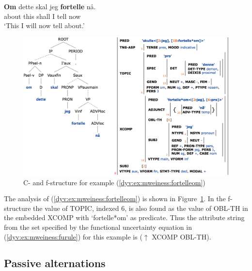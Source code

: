 \documentclass[output=paper]{langsci/langscibook}
\begin{document}
\ea\label{dyv:ex:mweiness:fortelleom}
\gll \textbf{Om} dette skal jeg \textbf{fortelle} nå.\\
     about this shall I tell now\\
\glt `This I will now tell about.'
\z

%

\begin{figure}
  \includegraphics[width=\textwidth]{figures/fortelle-om-c-f.png}
  \caption{C- and f-structure for example (\ref{dyv:ex:mweiness:fortelleom})}
  \label{dyv:fig:mweiness:fortelle-om-c-f}
\end{figure}

The analysis of  (\ref{dyv:ex:mweiness:fortelleom}) is shown in Figure~\ref{dyv:fig:mweiness:fortelle-om-c-f}.
In the f-structure the value of TOPIC, indexed 6, is also found as the value of OBL-TH in the embedded XCOMP with `fortelle*om' as predicate.
Thus the attribute string from the set specified by the functional uncertainty equation in (\ref{dyv:ex:mweiness:furule}) for this example is ($\uparrow$ XCOMP OBL-TH).

\subsection{Passive alternations}\label{dyv:sec:mweiness:vpidiomsyntax}
\end{document}
